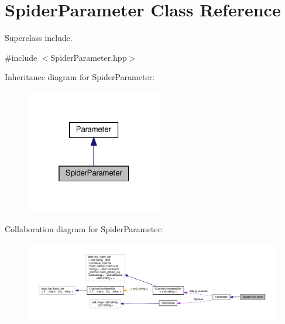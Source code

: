 \hypertarget{classSpiderParameter}{}\section{Spider\+Parameter Class Reference}
\label{classSpiderParameter}


Superclass include.  




{\ttfamily \#include $<$Spider\+Parameter.\+hpp$>$}



Inheritance diagram for Spider\+Parameter\+:
\nopagebreak
\begin{figure}[H]
\begin{center}
\leavevmode
\includegraphics[width=169pt]{df/da6/classSpiderParameter__inherit__graph}
\end{center}
\end{figure}


Collaboration diagram for Spider\+Parameter\+:
\nopagebreak
\begin{figure}[H]
\begin{center}
\leavevmode
\includegraphics[width=350pt]{d6/d0f/classSpiderParameter__coll__graph}
\end{center}
\end{figure}
